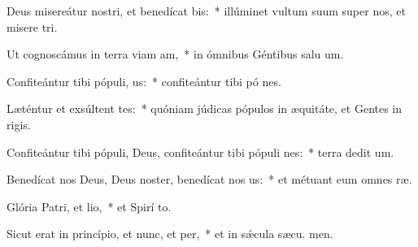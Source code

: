 \item Deus misereátur nostri, et benedícat bis:~* illúminet vultum suum super nos, et misere tri.
\item Ut cognoscámus in terra viam am,~* in ómnibus Géntibus salu um.
\item Confiteántur tibi pópuli, us:~* confiteántur tibi pó nes.
\item Læténtur et exsúltent tes:~* quóniam júdicas pópulos in æquitáte, et Gentes in  rigis.
\item Confiteántur tibi pópuli, Deus, confiteántur tibi pópuli nes:~* terra dedit  um.
\item Benedícat nos Deus, Deus noster, benedícat nos us:~* et métuant eum omnes  ræ.
\item Glória Patri, et lio,~* et Spirí to.
\item Sicut erat in princípio, et nunc, et per,~* et in sǽcula sæcu. men.

